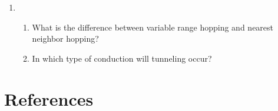 \documentclass[12pt]{elsarticle}
\begin{document}
\begin{enumerate}
\item \begin{enumerate}
	\item What is the difference between variable range hopping and nearest neighbor hopping?
	\item In which type of conduction will tunneling occur?
\end{enumerate}

\end{enumerate}

\section*{References}


\end{document}
